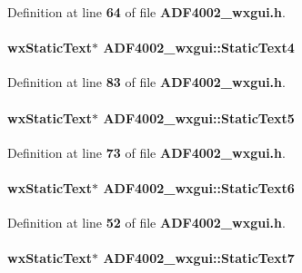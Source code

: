 Definition at line {\bf 64} of file {\bf A\+D\+F4002\+\_\+wxgui.\+h}.

\paragraph[{Static\+Text4}]{\setlength{\rightskip}{0pt plus 5cm}wx\+Static\+Text$\ast$ A\+D\+F4002\+\_\+wxgui\+::\+Static\+Text4}\label{classADF4002__wxgui_a71c4ca9fb13b0722aea3589b9c7bccf1}


Definition at line {\bf 83} of file {\bf A\+D\+F4002\+\_\+wxgui.\+h}.

\paragraph[{Static\+Text5}]{\setlength{\rightskip}{0pt plus 5cm}wx\+Static\+Text$\ast$ A\+D\+F4002\+\_\+wxgui\+::\+Static\+Text5}\label{classADF4002__wxgui_ac7a38754a28eb7ce9e835ef96bc80346}


Definition at line {\bf 73} of file {\bf A\+D\+F4002\+\_\+wxgui.\+h}.

\paragraph[{Static\+Text6}]{\setlength{\rightskip}{0pt plus 5cm}wx\+Static\+Text$\ast$ A\+D\+F4002\+\_\+wxgui\+::\+Static\+Text6}\label{classADF4002__wxgui_acba93685411460bc18cc43ad8c27dd36}


Definition at line {\bf 52} of file {\bf A\+D\+F4002\+\_\+wxgui.\+h}.

\paragraph[{Static\+Text7}]{\setlength{\rightskip}{0pt plus 5cm}wx\+Static\+Text$\ast$ A\+D\+F4002\+\_\+wxgui\+::\+Static\+Text7}\label{classADF4002__wxgui_a6d41f7c40b4e010c77fa6f5eb0bd4e4e}


